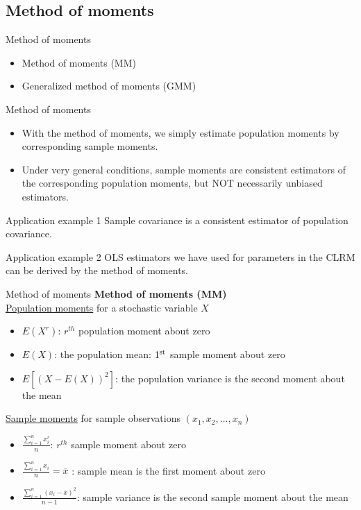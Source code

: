 \documentclass{beamer}
\begin{document}
\subsection{Method of moments}
\begin{frame}{Method of moments}
\begin{itemize}
    \item Method of moments (MM)
    \bigskip
    \item Generalized method of moments (GMM)
\end{itemize} 
\end{frame}
\begin{frame}{Method of moments}

\begin{itemize}
\item With the method of moments, we simply estimate population moments by corresponding sample moments. 
\medskip
\item Under very general conditions, sample moments are consistent estimators of the corresponding population moments, but NOT necessarily unbiased estimators.
\end{itemize}
\begin{block}{Application example 1}
Sample covariance is a consistent estimator of population covariance.
\end{block}
\begin{block}{Application example 2}
OLS estimators we have used for parameters in the CLRM can be derived by the method of moments. 
\end{block}
\end{frame}
\begin{frame}{Method of moments}
\textbf{Method of moments (MM)}\\
\smallskip
\underline{Population moments} for a stochastic variable $X$\\
\begin{itemize}
\item $E(X^r)$: $r^{th}$ population moment about zero
\item $E(X)$: the population mean: $1^{\textnormal{st}}$ sample moment about zero
\item $E[(X-E(X))^2]$: the population variance is the second moment about the mean
\end{itemize}
\medskip
\underline{Sample moments} for sample observations $(x_1, x_2, \dots,x_n)$
\begin{itemize}
\item $\frac{\sum_{i=1}^n x^r_i}{n}$: $r^{th}$ sample moment about zero
\item $\frac{\sum_{i=1}^n x_i}{n}=\overline{x} $ : sample mean is the first moment about zero
\item $\frac{\sum_{i=1}^n (x_i-\overline{x})^2}{n-1}$: sample variance is the second sample moment about the mean
\end{itemize}
\end{frame}
\end{document}
